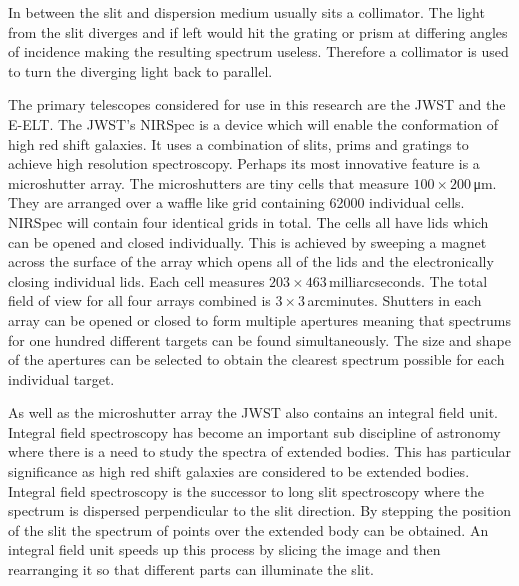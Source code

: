 	In between the slit and dispersion medium usually sits a collimator. The light from the slit diverges and if left would hit the grating or prism at differing angles of incidence making the resulting spectrum useless. Therefore a collimator is used to turn the diverging light back to parallel.

	The primary telescopes considered for use in this research are the JWST and the E-ELT. The JWST’s NIRSpec is a device which will enable the conformation of high red shift galaxies. It uses a combination of slits, prims and gratings to achieve high resolution spectroscopy. Perhaps its most innovative feature is a microshutter array. The microshutters are tiny cells that measure $100 \times 200$\,\si{\micro\metre}. They are arranged over a waffle like grid containing \num{62000} individual cells. NIRSpec will contain four identical grids in total. The cells all have lids which can be opened and closed individually. This is achieved by sweeping a magnet across the surface of the array which opens all of the lids and the electronically closing individual lids. Each cell measures $203 \times 463$\,milliarcseconds. The total field of view for all four arrays combined is $3 \times 3$\,arcminutes. Shutters in each array can be opened or closed to form multiple apertures meaning that spectrums for one hundred different targets can be found simultaneously. The size and shape of the apertures can be selected to obtain the clearest spectrum possible for each individual target.

	As well as the microshutter array the JWST also contains an integral field unit. Integral field spectroscopy has become an important sub discipline of astronomy where there is a need to study the spectra of extended bodies. This has particular significance as high red shift galaxies are considered to be extended bodies. Integral field spectroscopy is the successor to long slit spectroscopy where the spectrum is dispersed perpendicular to the slit direction. By stepping the position of the slit the spectrum of points over the extended body can be obtained. An integral field unit speeds up this process by slicing the image and then rearranging it so that different parts can illuminate the slit.

